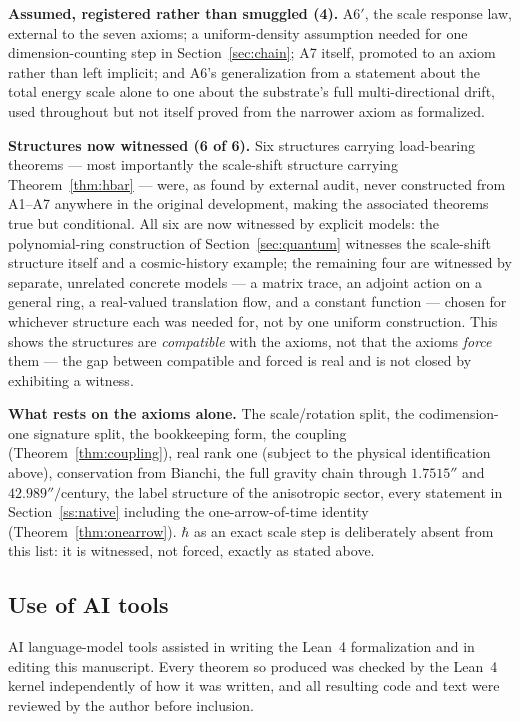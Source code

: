 \documentclass[aps,prd,twocolumn,superscriptaddress,nofootinbib]{revtex4-2}
\begin{document}
\textbf{Assumed, registered rather than smuggled (4).} A6$'$, the scale
response law, external to the seven axioms; a uniform-density assumption
needed for one dimension-counting step in Section~\ref{sec:chain}; A7
itself, promoted to an axiom rather than left implicit; and A6's
generalization from a statement about the total energy scale alone to
one about the substrate's full multi-directional drift, used throughout
but not itself proved from the narrower axiom as formalized.

\textbf{Structures now witnessed (6 of 6).} Six structures carrying
load-bearing theorems — most importantly the scale-shift structure
carrying Theorem~\ref{thm:hbar} — were, as found by external audit, never
constructed from A1–A7 anywhere in the original development, making the
associated theorems true but conditional. All six are now witnessed by
explicit models: the polynomial-ring construction of
Section~\ref{sec:quantum} witnesses the scale-shift structure itself and
a cosmic-history example; the remaining four are witnessed by separate,
unrelated concrete models — a matrix trace, an adjoint action on a
general ring, a real-valued translation flow, and a constant function —
chosen for whichever structure each was needed for, not by one uniform
construction. This shows the structures are \emph{compatible} with the
axioms, not that the axioms \emph{force} them — the gap between
compatible and forced is real and is not closed by exhibiting a witness.

\textbf{What rests on the axioms alone.} The scale/rotation split, the
codimension-one signature split, the bookkeeping form, the coupling
(Theorem~\ref{thm:coupling}), real rank one (subject to the physical
identification above), conservation from Bianchi, the full gravity
chain through $1.7515''$ and $42.989''/$century, the label structure of
the anisotropic sector, every statement in Section~\ref{ss:native}
including the one-arrow-of-time identity (Theorem~\ref{thm:onearrow}).
$\hbar$ as an exact scale step is deliberately absent from this list: it
is witnessed, not forced, exactly as stated above.

\subsection*{Use of AI tools}

AI language-model tools assisted in writing the Lean~4 formalization
and in editing this manuscript. Every theorem so produced was checked by
the Lean~4 kernel independently of how it was written, and all resulting
code and text were reviewed by the author before inclusion.
\end{document}
